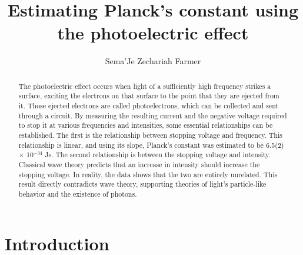 \documentclass[rc,ec]{physicsinprogress}
\begin{document}
\title{Estimating Planck's constant using the photoelectric effect}%


\author{Sema'Je Zechariah Farmer}
%

\begin{abstract}

The photoelectric effect occurs when light of a sufficiently high frequency strikes a surface, exciting the electrons on that surface to the point that they are ejected from it. Those ejected electrons are called photoelectrons, which can be collected and sent through a circuit. By measuring the resulting current and the negative voltage required to stop it at various frequencies and intensities, some essential relationships can be established. The first is the relationship between stopping voltage and frequency. This relationship is linear, and using its slope, Planck’s constant was estimated to be 6.5(2) \(\times\) 10\(^{-34}\) Js. The second relationship is between the stopping voltage and intensity. Classical wave theory predicts that an increase in intensity should increase the stopping voltage. In reality, the data shows that the two are entirely unrelated. This result directly contradicts wave theory, supporting theories of light’s particle-like behavior and the existence of photons.



\end{abstract}

\maketitle


\section{\label{sec:photoelectric-intro} Introduction}
\end{document}
